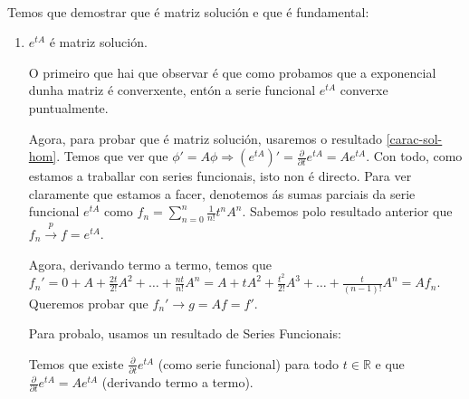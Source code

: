 \documentclass[11pt, a4paper,twoside]{article}
\makeatletter
\theoremstyle{theorem-style}  %
\renewenvironment{proof}[1][\proofname]{\par
	\pushQED{\qed}%
	\normalfont \topsep6\p@\@plus6\p@\relax
	\list{}{%
		\settowidth{\leftmargin}{\quad:\hskip\labelsep}%
		\setlength{\labelwidth}{0pt}%
		\setlength{\itemindent}{-\leftmargin}%
	}%
	\item[\hskip\labelsep\itshape#1\@addpunct{:}]\ignorespaces
}{%
	\popQED\endlist\@endpefalse
}
\theoremstyle{definition-style}
\theoremstyle{example-style}
\makeatother
\begin{document}
\begin{proof} \ \\
	Temos que demostrar que é matriz solución e que é fundamental:
	\begin{enumerate}[\quad i)]
		\item $ e^{tA} $ é matriz solución.
		
		 O primeiro que hai que observar é que como probamos que a exponencial dunha matriz é converxente, entón a serie funcional $ e^{tA} $ converxe puntualmente.
		
		Agora, para probar que é matriz solución, usaremos o resultado \ref{carac-sol-hom}. Temos que ver que $ \phi'=A\phi \Rightarrow  (e^{tA})'=\frac{\partial}{\partial t}e^{tA}=Ae^{tA}$. Con todo, como estamos a traballar con series funcionais, isto non é directo. Para ver claramente que estamos a facer, denotemos ás sumas parciais da serie funcional $ e^{tA} $ como $ f_n =\sum_{n=0}^{n} \frac{1}{n!}t^nA^n$. Sabemos polo resultado anterior que $ f_n \xrightarrow{p} f=e^{tA}$.
		
		Agora, derivando termo a termo, temos que $ f_n'=0+A+ \frac{2t}{2!}A^2+\dots+\frac{nt}{n!}A^n =A+tA^2+\frac{t^2}{2!}A^3+\dots+\frac{t}{(n-1)!}A^n=Af_n $. Queremos probar que $ f_n'\rightarrow g=Af=f' $.
		
		Para probalo, usamos un resultado de Series Funcionais:
		
		
		\noindent{}
		
		Temos que existe $ \frac{\partial}{\partial t}e^{tA}$ (como serie funcional) para todo $t \in \mathbb{R} $ e que $ \frac{\partial}{\partial t}e^{tA}=Ae^{tA} $ (derivando termo a termo). 
		

\end{enumerate}
\end{proof}
\end{document}
